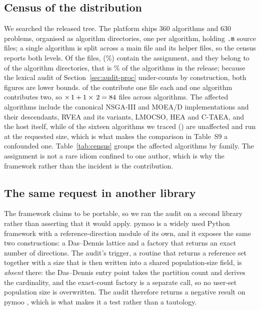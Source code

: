 \documentclass{SCIS2026}
\begin{document}
\subsection{Census of the distribution}
We searched the released tree. The platform ships 360 algorithms and 630 problems, organised as \nAlgTotal{} algorithm directories, one per algorithm, holding \nFilesTotal{} \texttt{.m} source files; a single algorithm is split across a main file and its helper files, so the census reports both levels. Of the \nFilesTotal{} files, \nFilesAffected{} (\pctAffected\%) contain the assignment, and they belong to \nAlgAffected{} of the \nAlgTotal{} algorithm directories, that is \pctAlgAffected\% of the algorithms in the release; because the lexical audit of Section~\ref{sec:audit-proc} under-counts by construction, both figures are lower bounds. \nAlgSingle{} of the \nAlgAffected{} contribute one file each and one algorithm contributes two, so \nAlgSingle{} $\times\,1 + 1\times\,2 = 84{}$ files across \nAlgAffected{} algorithms. The affected algorithms include the canonical NSGA-III and MOEA/D implementations and their descendants, RVEA and its variants, LMOCSO, HEA and C-TAEA, and the host itself, while \nTracedCtl{} of the sixteen algorithms we traced (\ctlNames{}) are unaffected and run at the requested size, which is what makes the comparison in Table~S9 a confounded one. Table~\ref{tab:census} groups the affected algorithms by family. The assignment is not a rare idiom confined to one author, which is why the framework rather than the incident is the contribution.

\begin{table}[!t]
\centering
\footnotesize
\caption{Census of the PlatEMO 4.16 algorithm tree, at both the algorithm and the file level, for the assignment \texttt{[Z,Problem.N] = UniformPoint(Problem.N,Problem.M)}. The algorithm count is the number of directories containing at least one affected file}
\label{tab:census}

\end{table}

\subsection{The same request in another library}
\label{sec:xplatform}
The framework claims to be portable, so we ran the audit on a second library rather than asserting that it would apply. pymoo is a widely used Python framework with a reference-direction module of its own, and it exposes the same two constructions: a Das--Dennis lattice and a factory that returns an exact number of directions. The audit's trigger, a routine that returns a reference set together with a size that is then written into a shared population-size field, is \emph{absent} there: the Das--Dennis entry point takes the partition count and derives the cardinality, and the exact-count factory is a separate call, so no user-set population size is overwritten. The audit therefore returns a negative result on pymoo \cite{28}, which is what makes it a test rather than a tautology.
\end{document}

